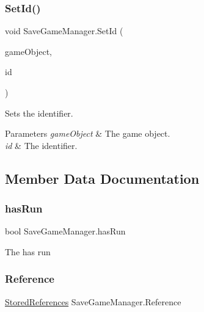 \subsubsection{\texorpdfstring{Set\+Id()}{SetId()}}
{\footnotesize\ttfamily void Save\+Game\+Manager.\+Set\+Id (\begin{DoxyParamCaption}\item[{Game\+Object}]{game\+Object,  }\item[{string}]{id }\end{DoxyParamCaption})\hspace{0.3cm}{\ttfamily [inline]}}



Sets the identifier. 


\begin{DoxyParams}{Parameters}
{\em game\+Object} & The game object.\\
\hline
{\em id} & The identifier.\\
\hline
\end{DoxyParams}


\subsection{Member Data Documentation}
\mbox{\label{class_save_game_manager_a3d69dbd52700e5a5291f9a1098469c49}} 
\subsubsection{\texorpdfstring{has\+Run}{hasRun}}
{\footnotesize\ttfamily bool Save\+Game\+Manager.\+has\+Run\hspace{0.3cm}{\ttfamily [static]}}



The has run 

\mbox{\label{class_save_game_manager_acc8730127bdf53e84b735585679ddb95}} 
\subsubsection{\texorpdfstring{Reference}{Reference}}
{\footnotesize\ttfamily \hyperlink{class_stored_references}{Stored\+References} Save\+Game\+Manager.\+Reference}




